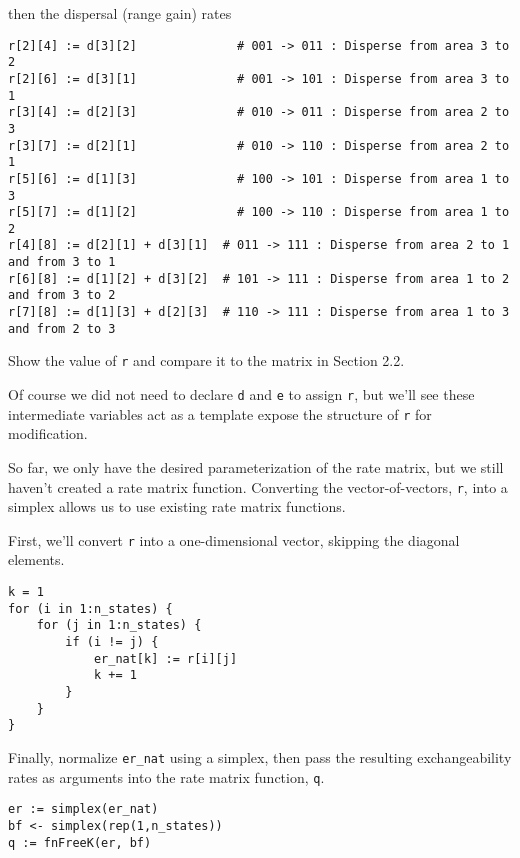 then the dispersal (range gain) rates

\begin{snugshade}
\begin{lstlisting}
r[2][4] := d[3][2]              # 001 -> 011 : Disperse from area 3 to 2
r[2][6] := d[3][1]              # 001 -> 101 : Disperse from area 3 to 1
r[3][4] := d[2][3]              # 010 -> 011 : Disperse from area 2 to 3
r[3][7] := d[2][1]              # 010 -> 110 : Disperse from area 2 to 1
r[5][6] := d[1][3]              # 100 -> 101 : Disperse from area 1 to 3
r[5][7] := d[1][2]              # 100 -> 110 : Disperse from area 1 to 2
r[4][8] := d[2][1] + d[3][1]  # 011 -> 111 : Disperse from area 2 to 1 and from 3 to 1
r[6][8] := d[1][2] + d[3][2]  # 101 -> 111 : Disperse from area 1 to 2 and from 3 to 2
r[7][8] := d[1][3] + d[2][3]  # 110 -> 111 : Disperse from area 1 to 3 and from 2 to 3
\end{lstlisting}
\end{snugshade}

Show the value of {\tt r} and compare it to the matrix in Section 2.2.

Of course we did not need to declare {\tt d} and {\tt e} to assign {\tt r}, but we'll see these intermediate variables act as a template expose the structure of {\tt r} for modification.

So far, we only have the desired parameterization of the rate matrix, but we still haven't created a rate matrix function. Converting the vector-of-vectors, {\tt r}, into a simplex allows us to use existing rate matrix functions. 

First, we'll convert {\tt r} into a one-dimensional vector, skipping the diagonal elements.

\begin{snugshade}
\begin{lstlisting}
k = 1
for (i in 1:n_states) {
    for (j in 1:n_states) {
        if (i != j) {
            er_nat[k] := r[i][j]
            k += 1
        }
    }
}
\end{lstlisting}
\end{snugshade}

Finally, normalize {\tt er\_nat} using a simplex, then pass the resulting exchangeability rates as arguments into the rate matrix function, {\tt q}.

\begin{snugshade}
\begin{lstlisting}
er := simplex(er_nat)
bf <- simplex(rep(1,n_states))
q := fnFreeK(er, bf)
\end{lstlisting}
\end{snugshade}

